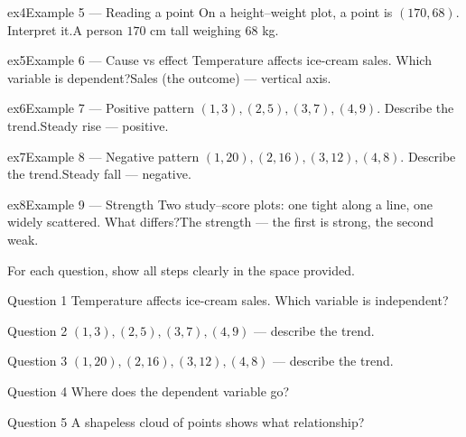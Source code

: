 \documentclass[11pt]{article}
\begin{document}
\begin{example}{ex4}{Example 5 --- Reading a point}
On a height–weight plot, a point is $(170,68)$. Interpret it.\soln A person $170$ cm tall weighing $68$ kg.
\end{example}

\begin{example}{ex5}{Example 6 --- Cause vs effect}
Temperature affects ice-cream sales. Which variable is dependent?\soln Sales (the outcome) — vertical axis.
\end{example}

\begin{example}{ex6}{Example 7 --- Positive pattern}
$(1,3),(2,5),(3,7),(4,9)$. Describe the trend.\soln Steady rise — positive.
\end{example}

\begin{example}{ex7}{Example 8 --- Negative pattern}
$(1,20),(2,16),(3,12),(4,8)$. Describe the trend.\soln Steady fall — negative.
\end{example}

\begin{example}{ex8}{Example 9 --- Strength}
Two study–score plots: one tight along a line, one widely scattered. What differs?\soln The strength — the first is strong, the second weak.
\end{example}

\clearpage
{}
For each question, show all steps clearly in the space provided.

\begin{qbox}{Question 1}
Temperature affects ice-cream sales. Which variable is independent?\workspace{2.4cm}
\end{qbox}

\begin{qbox}{Question 2}
$(1,3),(2,5),(3,7),(4,9)$ — describe the trend.\workspace{2.4cm}
\end{qbox}

\begin{qbox}{Question 3}
$(1,20),(2,16),(3,12),(4,8)$ — describe the trend.\workspace{2.4cm}
\end{qbox}

\begin{qbox}{Question 4}
Where does the dependent variable go?\workspace{2.4cm}
\end{qbox}

\begin{qbox}{Question 5}
A shapeless cloud of points shows what relationship?\workspace{2.4cm}
\end{qbox}
\end{document}

